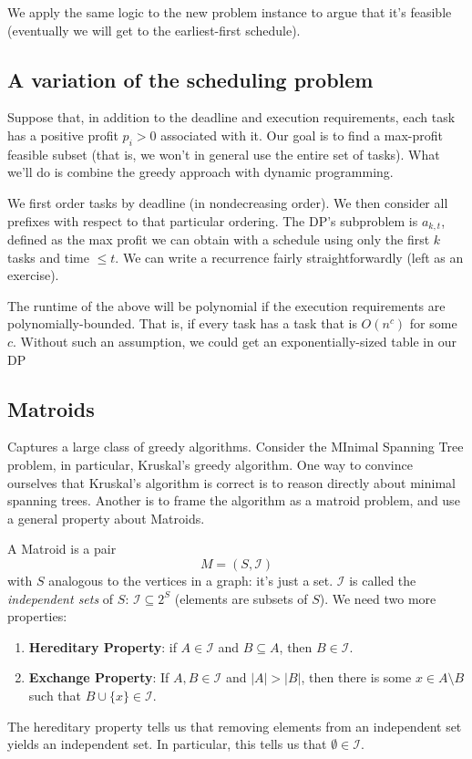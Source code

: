 \documentclass{article}
\begin{document}
We apply the same logic to the new problem instance to argue that it's feasible 
(eventually we will get to the earliest-first schedule).




\subsection{A variation of the scheduling problem}

Suppose that, in addition to the deadline and execution requirements,
each task has a positive profit $p_i > 0$ associated with it.
Our goal is to find a max-profit feasible subset (that is, we won't in general
use the entire set of tasks).
What we'll do is combine the greedy approach with dynamic programming.

We first order tasks by deadline (in nondecreasing order).
We then consider all prefixes with respect to that particular ordering.
The DP's subproblem is $a_{k,t}$, defined as the max profit we can
obtain with a schedule using only the first $k$ tasks and time $\leq t$.
We can write a recurrence fairly straightforwardly (left as an exercise).

The runtime of the above will be polynomial if the execution requirements
are polynomially-bounded.
That is, if every task has a task that is $O(n^c)$ for some $c$.
Without such an assumption, we could get an exponentially-sized
table in our DP


\subsection{Matroids}

Captures a large class of greedy algorithms.
Consider the MInimal Spanning Tree problem, in particular, Kruskal's
greedy algorithm.
One way to convince ourselves that Kruskal's algorithm is correct
is to reason directly about minimal spanning trees.
Another is to frame the algorithm as a matroid problem, and use a general
property about Matroids.

A Matroid is a pair
$$
M = (S,\mathcal I)
$$
with $S$ analogous to the vertices in a graph: it's just a set.
$\mathcal I$ is called the \emph{independent sets} of $S$: $\mathcal I \subseteq 2^S$ (elements are subsets of $S$).
We need two more properties:
\begin{enumerate}
	\item
	\textbf{Hereditary Property}: if $A\in\mathcal I$ and $B\subseteq A$, 
	then $B\in\mathcal I$.
	
	\item
	\textbf{Exchange Property}:
	If $A,B\in \mathcal I$ and $|A| > |B|$, then
	there is some $x \in A\setminus B$ such that $B\cup\{x\} \in \mathcal I$.
\end{enumerate}
The hereditary property tells us that removing elements from an independent
set yields an independent set.
In particular, this tells us that $\emptyset\in\mathcal I$.
\end{document}
